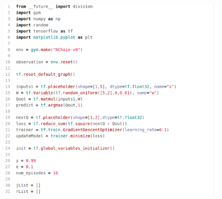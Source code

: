 \begin{figure}[ht]
	\centering
	\includegraphics*[width=15cm,height=20cm,keepaspectratio]{figuras/nchain1} 
	\label{fig:nchain code 1}
\end{figure}

